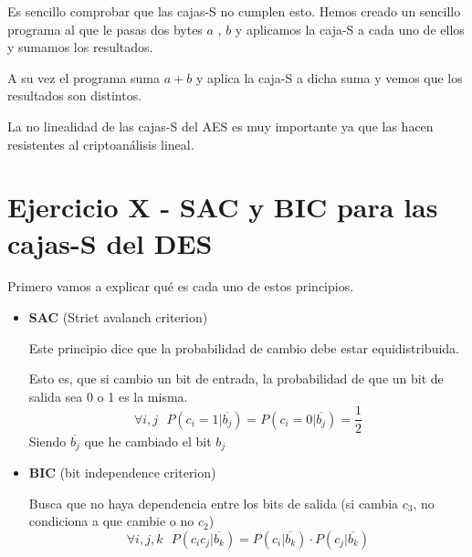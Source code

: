 \documentclass{apuntes}
\begin{document}
Es sencillo comprobar que las cajas-S no cumplen esto. Hemos creado un sencillo programa al que le pasas dos bytes $a$ , $b$ y aplicamos la caja-S a cada uno de ellos y sumamos los resultados.

A su vez el programa suma $a + b$ y aplica la caja-S a dicha suma y vemos que los resultados son distintos.

La no linealidad de las cajas-S del AES es muy importante ya que las hacen resistentes al criptoanálisis lineal.

\section{Ejercicio X - SAC y BIC para las cajas-S del DES}

Primero vamos a explicar qué es cada uno de estos principios.

\begin{itemize}
	
	\item \textbf{SAC} (Strict avalanch criterion)
	
	Este principio dice que la probabilidad de cambio debe estar equidistribuida.
	
	Esto es, que si cambio un bit de entrada, la probabilidad de que un bit de salida sea 0 o 1 es la misma.
	$$\forall i,j\text{  }P(c_i=1|\overline{b_j})= P(c_i=0|\overline{b_j}) = \frac{1}{2}$$
	Siendo $\overline{b_j}$ que he cambiado el bit $b_j$
	
	\item \textbf{BIC} (bit independence criterion)
	
	Busca que no haya dependencia entre los bits de salida (si cambia $c_3$, no condiciona a que cambie o no $c_2$) 
	$$\forall i,j,k \text{  } P(c_ic_j|\overline{b_k}) = P(c_i|\overline{b_k})\cdot P(c_j|\overline{b_k})$$
	
\end{itemize} 

\printindex
\end{document}
